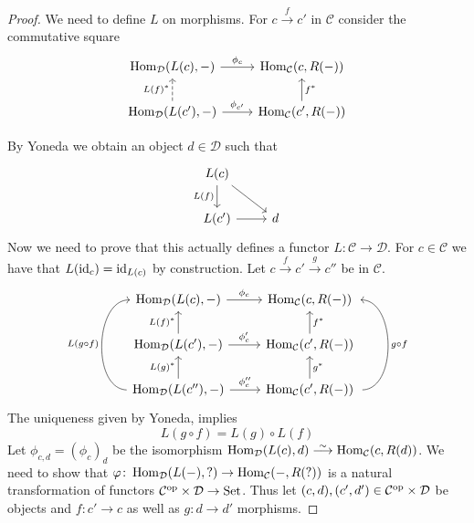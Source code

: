 \begin{proof}
    We need to define $L$ on morphisms.
    For $c \xrightarrow{f}c'$ in $\mathcal{C}$ consider the commutative square
    \[
    \begin{tikzcd}
        \Hom_{\mathcal{D}}(L(c),-)
        \arrow[r, "\phi_c"]
        &
        \Hom_{\mathcal{C}}(c,R(-))
        \\
        \Hom_{\mathcal{D}}(L(c'),-)
        \arrow[u, dashed, "L(f)^*"]
        \arrow[r, "\phi_{c'}"]
        &
        \Hom_{\mathcal{C}}(c',R(-))
        \arrow[u, "f^*"']
    \end{tikzcd}
    \]

    By Yoneda we obtain an object $d \in\mathcal{D}$ such that
    \[
    \begin{tikzcd}
        L(c)
        \arrow[d, "L(f)"']
        \arrow[rd]
        &
        \\
        L(c')
        \arrow[r]
        &
        d
    \end{tikzcd}
    \]
    Now we need to prove that this actually defines a functor $L\colon \mathcal{C} \to \mathcal{D}$.
    For $c \in \mathcal{C}$ we have that $L(\operatorname{id}_c)=\operatorname{id}_{L(c)}$ by construction.
    Let $c \xrightarrow{f}c' \xrightarrow{g}c''$ be in $\mathcal{C}$.
    \[
    \begin{tikzcd}
        \Hom_{\mathcal{D}}(L(c),-)
        \arrow[r, "\phi_c"]
        &
        \Hom_{\mathcal{C}}(c, R(-))
        \\
        \Hom_{\mathcal{D}}(L(c'),-)
        \arrow[r, "\phi_c'"]
        \arrow[u, "L(f)^*"]
        &
        \Hom_{\mathcal{C}}(c', R(-))
        \arrow[u, "f^*"']
        \\        
        \Hom_{\mathcal{D}}(L(c''),-)
        \arrow[r, "\phi_c''"]
        \arrow[u, "L(g)^*"]
        \arrow[uu, bend left=90, "L(g \circ f)"]
        &
        \Hom_{\mathcal{C}}(c', R(-))
        \arrow[u, "g^*"']
        \arrow[uu,bend right=90,  shift right ,"g \circ f"']
    \end{tikzcd}
    \]
    The uniqueness given by Yoneda, implies
    \[
    L(g \circ f) = L(g) \circ L(f)
    \]
    Let $\phi_{c,d}=(\phi_c)_d$ be the isomorphism $ \Hom_{ \mathcal{ D } } ( L ( c ) , d ) \isomorphism \Hom_{ \mathcal{ C } } ( c , R ( d ) ) $.
    We need to show that $ \varphi \colon \operatorname{Hom}_{ \mathcal{ D } } ( L ( - ) , ? ) \to \operatorname{Hom}_{ \mathcal{ C } } ( - , R ( ? ) ) $ is a natural transformation of functors $ \mathcal{ C }^{ \operatorname{op} } \times \mathcal{ D } \to \operatorname{Set} $.
    Thus let $ ( c , d ) , ( c' , d' ) \in \mathcal{ C }^{ \operatorname{op} } \times \mathcal{ D } $  be objects and $ f \colon c' \to c $ as well as $ g \colon d  \to d' $ morphisms.

\end{proof}
